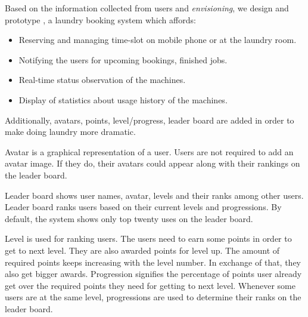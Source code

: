 Based on the information collected from users and \emph{envisioning}, we design and prototype {\toolname}, a laundry booking system which affords:
\begin{itemize}
\item Reserving and managing time-slot on mobile phone or at the laundry room.
\item Notifying the users for upcoming bookings, finished jobs.
\item Real-time status observation of the machines.
\item Display of statistics about usage history of the machines.
\end{itemize}
Additionally, avatars, points, level/progress, leader board are added in order to make doing laundry more dramatic.

Avatar is a graphical representation of a user. Users are not required to add an avatar image. If they do, their avatars could appear along with their rankings on the leader board. 

Leader board shows user names, avatar, levels and their ranks among other users. Leader board ranks users based on their current levels and progressions. By default, the system shows only top twenty uses on the leader board.

Level is used for ranking users. The users need to earn some points in order to get to next level. They are also awarded points for level up. The amount of required points keeps increasing with the level number. In exchange of that, they also get bigger awards. Progression signifies the percentage of points user already get over the required points they need for getting to next level. Whenever some users are at the same level, progressions are used to determine their ranks on the leader board.
 
